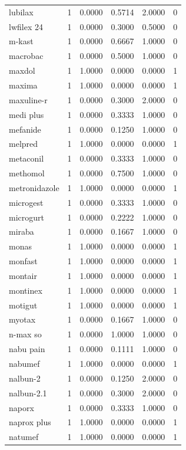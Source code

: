 \begin{longtable}{p{3.0cm}rrrrr}
lubilax & 1 & 0.0000 & 0.5714 & 2.0000 & 0 \\
lwfilex 24 & 1 & 0.0000 & 0.3000 & 0.5000 & 0 \\
m-kast & 1 & 0.0000 & 0.6667 & 1.0000 & 0 \\
macrobac & 1 & 0.0000 & 0.5000 & 1.0000 & 0 \\
maxdol & 1 & 1.0000 & 0.0000 & 0.0000 & 1 \\
maxima & 1 & 1.0000 & 0.0000 & 0.0000 & 1 \\
maxuline-r & 1 & 0.0000 & 0.3000 & 2.0000 & 0 \\
medi plus & 1 & 0.0000 & 0.3333 & 1.0000 & 0 \\
mefanide & 1 & 0.0000 & 0.1250 & 1.0000 & 0 \\
melpred & 1 & 1.0000 & 0.0000 & 0.0000 & 1 \\
metaconil & 1 & 0.0000 & 0.3333 & 1.0000 & 0 \\
methomol & 1 & 0.0000 & 0.7500 & 1.0000 & 0 \\
metronidazole & 1 & 1.0000 & 0.0000 & 0.0000 & 1 \\
microgest & 1 & 0.0000 & 0.3333 & 1.0000 & 0 \\
microgurt & 1 & 0.0000 & 0.2222 & 1.0000 & 0 \\
miraba & 1 & 0.0000 & 0.1667 & 1.0000 & 0 \\
monas & 1 & 1.0000 & 0.0000 & 0.0000 & 1 \\
monfast & 1 & 1.0000 & 0.0000 & 0.0000 & 1 \\
montair & 1 & 1.0000 & 0.0000 & 0.0000 & 1 \\
montinex & 1 & 1.0000 & 0.0000 & 0.0000 & 1 \\
motigut & 1 & 1.0000 & 0.0000 & 0.0000 & 1 \\
myotax & 1 & 0.0000 & 0.1667 & 1.0000 & 0 \\
n-max so & 1 & 0.0000 & 1.0000 & 1.0000 & 0 \\
nabu pain & 1 & 0.0000 & 0.1111 & 1.0000 & 0 \\
nabumef & 1 & 1.0000 & 0.0000 & 0.0000 & 1 \\
nalbun-2 & 1 & 0.0000 & 0.1250 & 2.0000 & 0 \\
nalbun-2.1 & 1 & 0.0000 & 0.3000 & 2.0000 & 0 \\
naporx & 1 & 0.0000 & 0.3333 & 1.0000 & 0 \\
naprox plus & 1 & 1.0000 & 0.0000 & 0.0000 & 1 \\
natumef & 1 & 1.0000 & 0.0000 & 0.0000 & 1 \\

\end{longtable}
